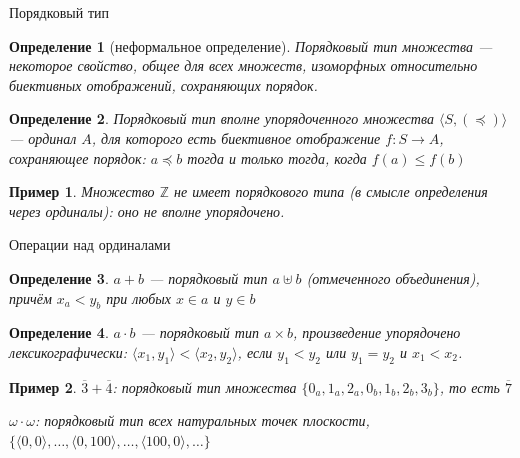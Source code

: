 \documentclass[aspectratio=169]{beamer}
\newtheorem{dfn}{Определение}[section]
\newtheorem{exm}{Пример}[section]
\begin{document}
\begin{frame}{Порядковый тип}
\begin{dfn}[неформальное определение]Порядковый тип множества --- некоторое свойство, общее для всех множеств, 
изоморфных относительно биективных отображений, сохраняющих порядок.\end{dfn}

\begin{dfn}Порядковый тип вполне упорядоченного множества $\langle S, (\preceq)\rangle$ --- ординал $A$, для которого есть биективное отображение $f: S \rightarrow A$, сохраняющее порядок:
$a \preceq b$ тогда и только тогда, когда $f(a) \le f(b)$\end{dfn}

\begin{exm}Множество $\mathbb{Z}$ не имеет порядкового типа (в смысле определения через ординалы): оно не вполне упорядочено.\end{exm}
\end{frame}

\begin{frame}{Операции над ординалами}
\begin{dfn}$a + b$ --- порядковый тип $a \uplus b$ (отмеченного объединения), причём $x_a < y_b$ при любых
$x \in a$ и $y \in b$\end{dfn}

\begin{dfn}$a \cdot b$ --- порядковый тип $a \times b$, произведение упорядочено лексикографически: $\langle x_1, y_1 \rangle < \langle x_2, y_2 \rangle$, 
если $y_1 < y_2$ или $y_1 = y_2$ и $x_1 < x_2$.\end{dfn}

\begin{exm}$\overline{3} + \overline{4}$: порядковый тип множества $\{0_a, 1_a, 2_a, 0_b, 1_b, 2_b, 3_b\}$, то есть $\overline{7}$

$\omega \cdot \omega$: порядковый тип всех натуральных точек плоскости, $\{\langle 0,0 \rangle, \dots, \langle 0,100\rangle, \dots, \langle 100,0\rangle, \dots\}$\end{exm}
\end{frame}
\end{document}
